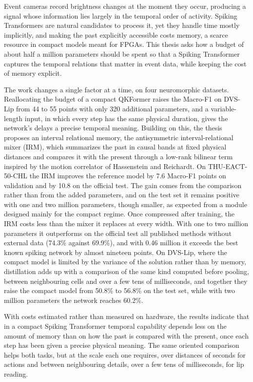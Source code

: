Event cameras record brightness changes at the moment they occur, producing a signal whose information lies largely in the temporal order of activity. Spiking Transformers are natural candidates to process it, yet they handle time mostly implicitly, and making the past explicitly accessible costs memory, a scarce resource in compact models meant for FPGAs. This thesis asks how a budget of about half a million parameters should be spent so that a Spiking Transformer captures the temporal relations that matter in event data, while keeping the cost of memory explicit.

The work changes a single factor at a time, on four neuromorphic datasets. Reallocating the budget of a compact QKFormer raises the Macro-F1 on DVS-Lip from 44 to 55 points with only 320 additional parameters, and a variable-length input, in which every step has the same physical duration, gives the network's delays a precise temporal meaning. Building on this, the thesis proposes an interval relational memory, the antisymmetric interval-relational mixer (IRM), which summarizes the past in causal bands at fixed physical distances and compares it with the present through a low-rank bilinear term inspired by the motion correlator of Hassenstein and Reichardt. On THU-EACT-50-CHL the IRM improves the reference model by 7.6 Macro-F1 points on validation and by 10.8 on the official test. The gain comes from the comparison rather than from the added parameters, and on the test set it remains positive with one and two million parameters, though smaller, as expected from a module designed mainly for the compact regime. Once compressed after training, the IRM costs less than the mixer it replaces at every width. With one to two million parameters it outperforms on the official test all published methods without external data (74.3\% against 69.9\%), and with 0.46 million it exceeds the best known spiking network by almost nineteen points. On DVS-Lip, where the compact model is limited by the variance of the solution rather than by memory, distillation adds up with a comparison of the same kind computed before pooling, between neighbouring cells and over a few tens of milliseconds, and together they raise the compact model from 50.8\% to 56.8\% on the test set, while with two million parameters the network reaches 60.2\%.

With costs estimated rather than measured on hardware, the results indicate that in a compact Spiking Transformer temporal capability depends less on the amount of memory than on how the past is compared with the present, once each step has been given a precise physical meaning. The same oriented comparison helps both tasks, but at the scale each one requires, over distances of seconds for actions and between neighbouring details, over a few tens of milliseconds, for lip reading.
